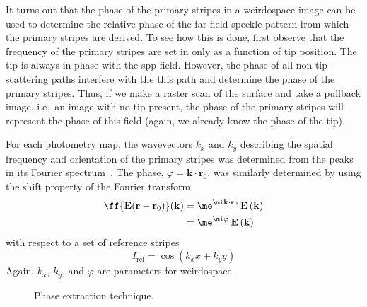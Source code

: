 It turns out that the phase of the primary stripes in a weirdospace image
can be used to determine the relative phase of the far field speckle
pattern from which the primary stripes are derived.  To see how this is
done, first observe that the frequency of the primary stripes are set in
 only as a function of tip position.  The tip
is always in phase with the \gls{spp} field.  However, the phase of all
non-tip-scattering paths interfere with the this path and determine the
phase of the primary stripes.  Thus, if we make a raster scan of the
surface and take a pullback image, i.e.\ an image with no tip present, the
phase of the primary stripes will represent the phase of this field (again,
we already know the phase of the tip).

For each photometry map, the wavevectors $k_x$ and $k_y$ describing the
spatial frequency and orientation of the primary stripes was determined
from the peaks in its Fourier spectrum~\cite{huntley1986speckle}.  The
phase, $\varphi=\mathbf{k}\cdot\mathbf{r}_0$, was similarly determined
by using the shift property of the Fourier transform
\begin{align}
\ff{\mathbf{E}(\mathbf{r}-\mathbf{r}_0)}(\mathbf{k}) &=
\me^{\mi \mathbf{k}\cdot \mathbf{r}_0}\,
\mathbf{E}\left(\mathbf{k}\right)\\
&= \me^{\mi \varphi}\, \mathbf{E}\left(\mathbf{k}\right)
\end{align}
with respect to a set of reference stripes
\begin{equation}
I_\mathrm{ref} = \cos(k_x x + k_y y)
\end{equation}
Again, $k_x$, $k_y$, and $\varphi$ are parameters for weirdospace.


\begin{figure}
\centering
\caption{Phase extraction technique.}
\label{fig:phaseextractiontechnique}
\end{figure}


